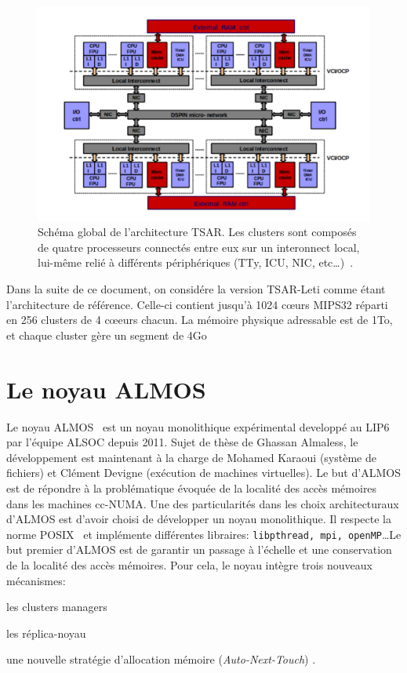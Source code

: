     \begin{figure}[ht]
      \centering \includegraphics[scale=0.241]{include/img/tsar.png}
      \caption{Schéma global de l'architecture TSAR. Les clusters sont composés
        de quatre processeurs connectés entre eux sur un interonnect local,
        lui-même relié à différents périphériques (TTy, ICU, NIC,
        etc\ldots)~\citep{greiner2009tsar}.}
      \label{fig:tsar}
    \end{figure}
     

    Dans la suite de ce document, on considére la version TSAR-Leti comme étant
    l'architecture de référence. Celle-ci contient jusqu'à 1024 c\oe urs MIPS32
    réparti en 256 clusters de 4 c\oe eurs chacun. La mémoire physique
    adressable est de 1To, et chaque cluster gère un segment de 4Go


  \section{Le noyau ALMOS}
  \label{sec:almos}

    Le noyau ALMOS~\cite{almaless2011almos,almaless2014universite} est un noyau
    monolithique expérimental developpé au LIP6 par l'équipe ALSOC depuis
    2011. Sujet de thèse de Ghassan Almaless, le développement est maintenant à
    la charge de Mohamed Karaoui (système de fichiers) et Clément Devigne
    (exécution de machines virtuelles). Le but d'ALMOS est de répondre à la
    problématique évoquée de la localité des accès mémoires dans les machines
    cc-NUMA. Une des particularités dans les choix architecturaux d'ALMOS est
    d'avoir choisi de développer un noyau monolithique. Il respecte la norme
    POSIX~\cite{posix2013} et implémente différentes libraires:
    \texttt{libpthread, mpi, openMP}\ldots Le but premier d'ALMOS est de
    garantir un passage à l'échelle et une conservation de la localité des accès
    mémoires. Pour cela, le noyau intègre trois nouveaux mécanismes:
    \benumline \item les clusters managers \item les réplica-noyau \item une
    nouvelle stratégie d'allocation mémoire (\textit{Auto-Next-Touch})
    \eenumline.

